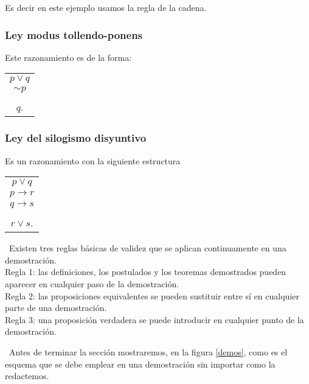 Es decir en este ejemplo usamos la regla de la cadena.

\subsubsection{Ley modus tollendo-ponens }

Este razonamiento es de la forma: 

\begin{center}
\begin{tabular}{c}
$p\vee q$\tabularnewline
$\sim p$\tabularnewline
\hline\tabularnewline
$q$.\tabularnewline
\end{tabular}
\par\end{center}

\subsubsection{Ley del silogismo disyuntivo}

Es un razonamiento con la siguiente estructura 

\begin{center}
\begin{tabular}{c}
$p\vee q$\tabularnewline
$p\longrightarrow r$\tabularnewline
$q\longrightarrow s$\tabularnewline
\hline\tabularnewline
$r\vee s$.\tabularnewline
\end{tabular}
\par\end{center}

\obs\ Existen tres reglas básicas de validez que se aplican continuamente
en una demostración.\\
 Regla 1: las definiciones, los postulados y los teoremas demostrados
pueden aparecer en cualquier paso de la demostración.\\
 Regla 2: las proposiciones equivalentes se pueden sustituir entre
sí en cualquier parte de una demostración.\\
 Regla 3: una proposición verdadera se puede introducir en cualquier
punto de la demostración.

\vspace{20pt}
 \obs\ Antes de terminar la sección mostraremos, en la figura \ref{demos},
como es el esquema que se debe emplear en una demostración sin importar
como la redactemos. 

